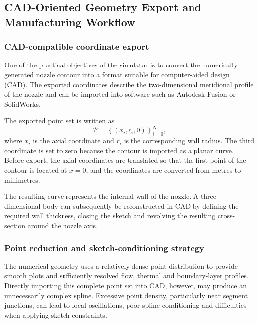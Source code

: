 \subsection{CAD-Oriented Geometry Export and Manufacturing Workflow}

\subsubsection{CAD-compatible coordinate export}

One of the practical objectives of the simulator is to convert the numerically
generated nozzle contour into a format suitable for computer-aided design (CAD).
The exported coordinates describe the two-dimensional meridional profile of the
nozzle and can be imported into software such as Autodesk Fusion or SolidWorks.

The exported point set is written as
\begin{equation}
    \mathcal{P}
    =
    \left\{
        (x_i,r_i,0)
    \right\}_{i=0}^{N},
\end{equation}
where \(x_i\) is the axial coordinate and \(r_i\) is the corresponding wall
radius. The third coordinate is set to zero because the contour is imported as
a planar curve. Before export, the axial coordinates are translated so that the
first point of the contour is located at \(x=0\), and the coordinates are
converted from metres to millimetres.

The resulting curve represents the internal wall of the nozzle. A
three-dimensional body can subsequently be reconstructed in CAD by defining
the required wall thickness, closing the sketch and revolving the resulting
cross-section around the nozzle axis.

\subsubsection{Point reduction and sketch-conditioning strategy}

The numerical geometry uses a relatively dense point distribution to provide
smooth plots and sufficiently resolved flow, thermal and boundary-layer
profiles. Directly importing this complete point set into CAD, however, may
produce an unnecessarily complex spline. Excessive point density, particularly
near segment junctions, can lead to local oscillations, poor spline conditioning
and difficulties when applying sketch constraints.

